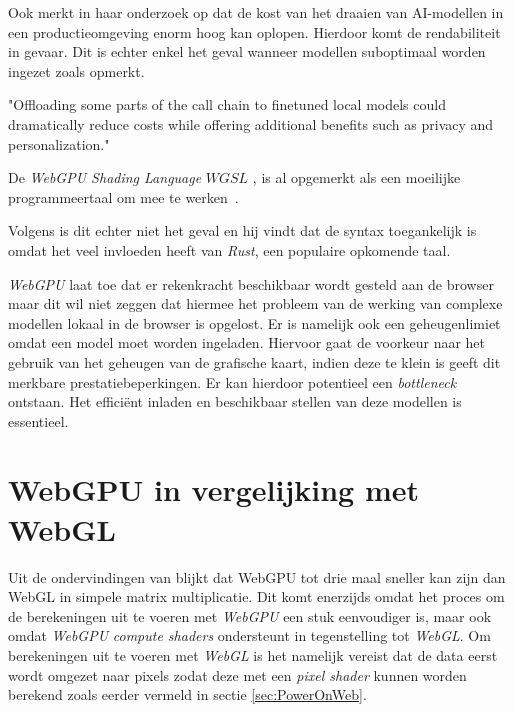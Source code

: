 \bigbreak{}

Ook \textcite{Huyen2023} merkt in haar onderzoek op dat de kost van het draaien van AI-modellen in een productieomgeving enorm hoog kan oplopen. Hierdoor komt de rendabiliteit in gevaar. Dit is echter enkel het geval wanneer modellen suboptimaal worden ingezet zoals \textcite{Fleetwood2023a} opmerkt.

\begin{displayquote}
    "Offloading some parts of the call chain to finetuned local models could dramatically reduce costs while offering additional benefits such as privacy and personalization."
\end{displayquote}

\bigbreak{}

De \textit{WebGPU Shading Language} \(\textit{WGSL}\) \autocite{W3C2024}, is al opgemerkt als een moeilijke programmeertaal om mee te werken~\autocite{Madrigal2023, Ashton2020}.

Volgens \textcite{Fleetwood2023a} is dit echter niet het geval en hij vindt dat de syntax toegankelijk is omdat het veel invloeden heeft van \textit{Rust}, een populaire opkomende taal.

\bigbreak{}

\textit{WebGPU} laat toe dat er rekenkracht beschikbaar wordt gesteld aan de browser maar dit wil niet zeggen dat hiermee het probleem van de werking van complexe modellen lokaal in de browser is opgelost. Er is namelijk ook een geheugenlimiet omdat een model moet worden ingeladen. Hiervoor gaat de voorkeur naar het gebruik van het geheugen van de grafische kaart, indien deze te klein is geeft dit merkbare prestatiebeperkingen. Er kan hierdoor potentieel een \textit{bottleneck} ontstaan. Het efficiënt inladen en beschikbaar stellen van deze modellen is essentieel.

\section{WebGPU in vergelijking met WebGL}

Uit de ondervindingen van \textcite{Radin2021} blijkt dat WebGPU tot drie maal sneller kan zijn dan WebGL in simpele matrix multiplicatie. Dit komt enerzijds omdat het proces om de berekeningen uit te voeren met \textit{WebGPU} een stuk eenvoudiger is, maar ook omdat \textit{WebGPU} \textit{compute shaders} ondersteunt in tegenstelling tot \textit{WebGL}. Om berekeningen uit te voeren met \textit{WebGL} is het namelijk vereist dat de data eerst wordt omgezet naar pixels zodat deze met een \textit{pixel shader} kunnen worden berekend zoals eerder vermeld in sectie \ref{sec:PowerOnWeb}. 

